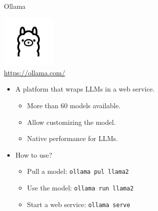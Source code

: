 \documentclass[presentation, 10pt]{beamer}\mode<presentation>{\usetheme{AMSBolognaFC}}
\begin{document}
\begin{frame}{Ollama}
\begin{center}
\includegraphics[width=0.2\textwidth]{img/ollama.png}\\
\url{https://ollama.com/}
\end{center}
\begin{itemize}
	\item A platform that wraps LLMs in a web service.
	\begin{itemize}
		\item More than 60 models available.
		\item Allow customizing the model.
		\item Native performance for LLMs.
	\end{itemize}
\end{itemize}
\begin{itemize}
	\item How to use?
	\begin{itemize}
		\item Pull a model: \texttt{ollama pul llama2}
		\item Use the model: \texttt{ollama run llama2}
		\item Start a web service: \texttt{ollama serve}
		\end{itemize}
\end{itemize}
\end{frame}
\end{document}
